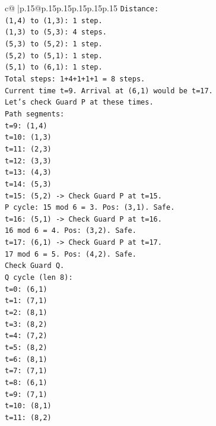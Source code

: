 \documentclass{article}
\begin{document}
{\begin{supertabular}{c@{$\;$}|p{.15\linewidth}@{}p{.15\linewidth}p{.15\linewidth}p{.15\linewidth}p{.15\linewidth}p{.15\linewidth}}
{{{\texttt{Distance:} \\
\texttt{(1,4) to (1,3): 1 step.} \\
\texttt{(1,3) to (5,3): 4 steps.} \\
\texttt{(5,3) to (5,2): 1 step.} \\
\texttt{(5,2) to (5,1): 1 step.} \\
\texttt{(5,1) to (6,1): 1 step.} \\
\texttt{Total steps: 1+4+1+1+1 = 8 steps.} \\
\texttt{Current time t=9. Arrival at (6,1) would be t=17.} \\
\texttt{Let's check Guard P at these times.} \\
\texttt{Path segments:} \\
\texttt{t=9: (1,4)} \\
\texttt{t=10: (1,3)} \\
\texttt{t=11: (2,3)} \\
\texttt{t=12: (3,3)} \\
\texttt{t=13: (4,3)} \\
\texttt{t=14: (5,3)} \\
\texttt{t=15: (5,2) {-}> Check Guard P at t=15.} \\
\texttt{P cycle: 15 mod 6 = 3. Pos: (3,1). Safe.} \\
\texttt{t=16: (5,1) {-}> Check Guard P at t=16.} \\
\texttt{16 mod 6 = 4. Pos: (3,2). Safe.} \\
\texttt{t=17: (6,1) {-}> Check Guard P at t=17.} \\
\texttt{17 mod 6 = 5. Pos: (4,2). Safe.} \\
\texttt{Check Guard Q.} \\
\texttt{Q cycle (len 8):} \\
\texttt{t=0: (6,1)} \\
\texttt{t=1: (7,1)} \\
\texttt{t=2: (8,1)} \\
\texttt{t=3: (8,2)} \\
\texttt{t=4: (7,2)} \\
\texttt{t=5: (8,2)} \\
\texttt{t=6: (8,1)} \\
\texttt{t=7: (7,1)} \\
\texttt{t=8: (6,1)} \\
\texttt{t=9: (7,1)} \\
\texttt{t=10: (8,1)} \\
\texttt{t=11: (8,2)} \\
}}}
\end{supertabular}}
\end{document}
